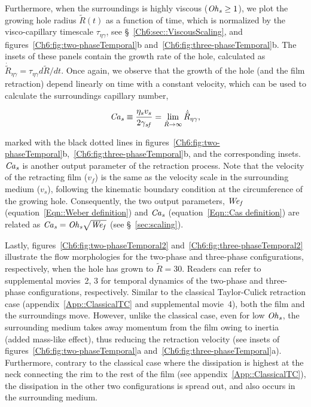 Furthermore, when the surroundings is highly viscous ($\mathit{Oh}_\mathit{s} \ge 1$), we plot the growing hole radius $\tilde{R}(t)$ as a function of time, which is normalized by the visco-capillary timescale $\tau_{\eta\gamma}$, see \S~\ref{Ch6:sec::ViscousScaling}, and figures~\ref{Ch6:fig:two-phaseTemporal}b and~\ref{Ch6:fig:three-phaseTemporal}b. The insets of these panels contain the growth rate of the hole, calculated as $\dot{\tilde{R}}_{\eta\gamma} = \tau_{\eta\gamma} d\tilde{R}/dt$. Once again, we observe that the growth of the hole (and the film retraction) depend linearly on time with a constant velocity, which can be used to calculate the surroundings capillary number,

\begin{align}
	\label{Eqn::Cas definition}
	\mathit{Ca}_\mathit{s} \equiv \frac{\eta_sv_s}{2\gamma_\mathit{sf}} = \lim\limits_{\tilde{R} \to \infty}\dot{\tilde{R}}_{\eta\gamma},
\end{align}

\noindent marked with the black dotted lines in figures~\ref{Ch6:fig:two-phaseTemporal}b,~\ref{Ch6:fig:three-phaseTemporal}b, and the corresponding insets. $\mathit{Ca}_\mathit{s}$ is another output parameter of the retraction process. Note that the velocity of the retracting film ($v_f$) is the same as the velocity scale in the surrounding medium ($v_s$), following the kinematic boundary condition at the circumference of the growing hole. Consequently, the two output parameters, $\mathit{We}_\mathit{f}$ (equation~\eqref{Eqn::Weber definition}) and $\mathit{Ca}_\mathit{s}$ (equation~\eqref{Eqn::Cas definition}) are related as $\mathit{Ca}_\mathit{s} = \mathit{Oh}_\mathit{s}\sqrt{\mathit{We}_\mathit{f}}$ (see \S~\ref{sec:scaling}). 

Lastly, figures~\ref{Ch6:fig:two-phaseTemporal2} and~\ref{Ch6:fig:three-phaseTemporal2} illustrate the flow morphologies for the two-phase and three-phase configurations, respectively, when the hole has grown to $\tilde{R} = 30$. Readers can refer to supplemental movies~{\color{Myfig}2, 3} for temporal dynamics of the two-phase and three-phase configurations, respectively. Similar to the classical Taylor-Culick retraction case (appendix~\ref{App::ClassicalTC} and supplemental movie~{\color{Myfig}4}), both the film and the surroundings move. However, unlike the classical case, even for low $\mathit{Oh}_\mathit{s}$, the surrounding medium takes away momentum from the film owing to inertia (added mass-like effect), thus reducing the retraction velocity (see insets of figures~\ref{Ch6:fig:two-phaseTemporal}a and~\ref{Ch6:fig:three-phaseTemporal}a). Furthermore, contrary to the classical case where the dissipation is highest at the neck connecting the rim to the rest of the film (see appendix~\ref{App::ClassicalTC}), the dissipation in the other two configurations is spread out, and also occurs in the surrounding medium. 

